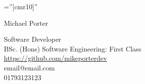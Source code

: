 \documentclass[a4paper,10pt]{article}
\begin{document}
\pagestyle{empty} %

\font\fb=''[cmr10]'' %

\par{\centering
		{\Huge Michael Porter
	}\par}
	
\vspace{5pt}

\par{\centering
		{\large Software Developer\\BSc. (Hons) Software Engineering: First Class \\
		\small\href{https://github.com/mikeporterdev/}{https://github.com/mikeporterdev} \\
		\small email@email.com \\
		\small 01793123123 
	}\bigskip\par}




% 









% 






\vspace*{\fill}
\end{document}
